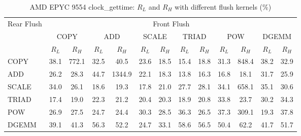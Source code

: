 \begin{table}[htbp]
\centering
\caption{AMD EPYC 9554 clock\_gettime: $R_L$ and $R_H$ with different flush kernels (\%)}
\label{tab:frkern-camd9554n2-clock_gettime}
\begin{tabular*}{\textwidth}{@{\extracolsep{\fill}}lcccccccccccc}
\toprule
\multirow{3}{*}{Rear Flush} & \multicolumn{12}{c}{Front Flush} \\ \cmidrule(lr){2-13}
& \multicolumn{2}{c}{COPY} & \multicolumn{2}{c}{ADD} & \multicolumn{2}{c}{SCALE} & \multicolumn{2}{c}{TRIAD} & \multicolumn{2}{c}{POW} & \multicolumn{2}{c}{DGEMM} \\ \cmidrule(lr){2-3} \cmidrule(lr){4-5} \cmidrule(lr){6-7} \cmidrule(lr){8-9} \cmidrule(lr){10-11} \cmidrule(lr){12-13}
& $R_L$ & $R_H$ & $R_L$ & $R_H$ & $R_L$ & $R_H$ & $R_L$ & $R_H$ & $R_L$ & $R_H$ & $R_L$ & $R_H$ \\ \midrule
COPY & 38.1 & 772.1 & 32.5 & 40.5 & 23.6 & 18.5 & 15.4 & 18.8 & 31.3 & 848.4 & 38.2 & 32.9 \\
ADD & 26.2 & 28.3 & 44.7 & 1344.9 & 22.1 & 18.3 & 13.8 & 16.3 & 16.8 & 18.1 & 31.7 & 25.9 \\
SCALE & 34.0 & 26.1 & 18.6 & 19.3 & 17.8 & 21.0 & 27.7 & 28.1 & 34.1 & 658.1 & 35.1 & 30.6 \\
TRIAD & 17.4 & 19.0 & 22.3 & 21.2 & 20.4 & 20.3 & 18.9 & 20.8 & 33.8 & 23.7 & 30.2 & 34.3 \\
POW & 26.9 & 27.5 & 24.7 & 24.4 & 30.3 & 28.5 & 36.3 & 26.5 & 37.3 & 309.1 & 19.3 & 37.8 \\
DGEMM & 39.1 & 41.3 & 56.3 & 52.2 & 24.7 & 33.1 & 58.6 & 56.5 & 50.4 & 62.2 & 41.7 & 51.7 \\
\bottomrule
\end{tabular*}
\end{table}